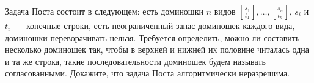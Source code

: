 Задача Поста состоит в следующем: есть доминошки $n$ видов $\left[\frac{s_1}{t_1}\right], \dots,
\left[\frac{s_n}{t_n}\right]$, $s_i$ и $t_i$~--- конечные строки, есть неограниченный запас доминошек каждого вида, доминошки
переворачивать нельзя. Требуется определить, можно ли составить несколько доминошек так, чтобы в верхней и нижней их половине
читалась одна и та же строка, такие последовательности доминошек будем называть согласованными. Докажите, что задача Поста
алгоритмически неразрешима.
